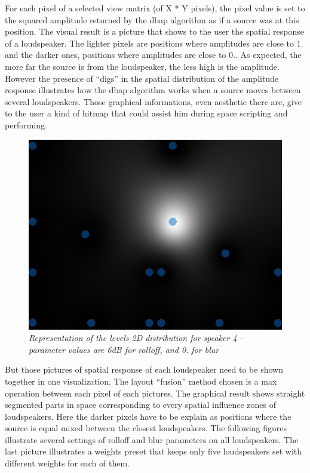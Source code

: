 \documentclass[twoside,10pt]{article}
\begin{document}
For each pixel of a selected view matrix (of X * Y pixels), the pixel value is set to the  squared amplitude returned by the dbap algorithm as if a source was at this position. The visual result is a picture that shows to the user the spatial response of  a loudspeaker. The lighter pixels are positions where amplitudes are close to 1. and the darker ones, positions where amplitudes are close to 0.. As expected, the more far the source is from the loudspeaker, the less high is the amplitude. However the presence of “digs” in the spatial distribution of the amplitude response illustrates how the dbap algorithm works when a source moves between several loudspeakers. Those graphical informations, even aesthetic there are, give to the user a kind of hitmap that could assist him during space scripting and performing.

\begin{figure}[ht]
\centerline{\includegraphics[scale=0.5]{spk4_r_6_b_0}}
\caption{{\it Representation of the levels 2D distribution for speaker 4 - parameter values are 6dB for rolloff, and 0. for blur}}  
\label{Level distribution for one speaker}
\end{figure}

But those pictures of spatial response of each loudspeaker need to be shown together in one visualization. The layout “fusion” method chosen is a max operation between each pixel of each pictures. The graphical result shows straight segmented parts in space corresponding to every spatial influence zones of loudspeakers. Here the darker pixels have to be explain as positions where the source is equal mixed between the closest loudspeakers. The following figures illustrate several settings of rolloff and blur parameters on all loudspeakers. The last picture illustrates a weights preset that keeps only five loudspeakers set with different weights for each of them.
\end{document}

